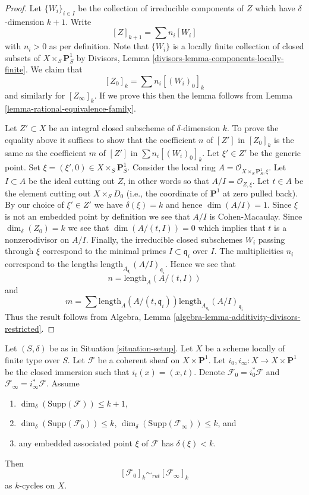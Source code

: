 \begin{proof}
Let $\{W_i\}_{i \in I}$ be the collection of irreducible
components of $Z$ which have $\delta$-dimension $k + 1$.
Write
$$
[Z]_{k + 1} = \sum n_i[W_i]
$$
with $n_i > 0$ as per definition. Note that $\{W_i\}$
is a locally finite collection of closed subsets of
$X \times_S \mathbf{P}^1_S$ by
Divisors, Lemma \ref{divisors-lemma-components-locally-finite}.
We claim that
$$
[Z_0]_k = \sum n_i[(W_i)_0]_k
$$
and similarly for $[Z_\infty]_k$. If we prove this then the lemma
follows from Lemma \ref{lemma-rational-equivalence-family}.

\medskip\noindent
Let $Z' \subset X$ be an integral closed subscheme of $\delta$-dimension $k$.
To prove the equality above it suffices to show that the coefficient $n$
of $[Z']$ in $[Z_0]_k$ is the same as the coefficient $m$ of
$[Z']$ in $\sum n_i[(W_i)_0]_k$. Let $\xi' \in Z'$ be the generic point.
Set $\xi = (\xi', 0) \in  X \times_S \mathbf{P}^1_S$.
Consider the local ring $A = \mathcal{O}_{X \times_S \mathbf{P}^1_S, \xi}$.
Let $I \subset A$ be the ideal cutting out $Z$, in other words so that
$A/I = \mathcal{O}_{Z, \xi}$. Let $t \in A$ be the element cutting
out $X \times_S D_0$ (i.e., the coordinate of $\mathbf{P}^1$ at zero
pulled back). By our choice of $\xi' \in Z'$ we have $\delta(\xi) = k$
and hence $\dim(A/I) = 1$. Since $\xi$ is not an embedded point by
definition we see that $A/I$ is Cohen-Macaulay. Since $\dim_\delta(Z_0)
= k$ we see that $\dim(A/(t, I)) = 0$ which implies that $t$
is a nonzerodivisor on $A/I$. Finally, the irreducible closed subschemes
$W_i$ passing through $\xi$ correspond to the minimal primes
$I \subset \mathfrak q_i$ over $I$. The multiplicities $n_i$ correspond
to the lengths $\text{length}_{A_{\mathfrak q_i}}(A/I)_{\mathfrak q_i}$.
Hence we see that
$$
n = \text{length}_A(A/(t, I))
$$
and
$$
m = \sum
\text{length}_A(A/(t, \mathfrak q_i))
\text{length}_{A_{\mathfrak q_i}}(A/I)_{\mathfrak q_i}
$$
Thus the result follows from
Algebra, Lemma \ref{algebra-lemma-additivity-divisors-restricted}.
\end{proof}

\begin{lemma}
\label{lemma-coherent-sheaf-cross-p1}
Let $(S, \delta)$ be as in Situation \ref{situation-setup}.
Let $X$ be a scheme locally of finite type over $S$.
Let $\mathcal{F}$ be a coherent sheaf on $X \times \mathbf{P}^1$.
Let $i_0, i_\infty : X \to X \times \mathbf{P}^1$ be the closed immersion
such that $i_t(x) = (x, t)$. Denote $\mathcal{F}_0 = i_0^*\mathcal{F}$ and
$\mathcal{F}_\infty = i_\infty^*\mathcal{F}$.
Assume
\begin{enumerate}
\item $\dim_\delta(\text{Supp}(\mathcal{F})) \leq k + 1$,
\item $\dim_\delta(\text{Supp}(\mathcal{F}_0)) \leq k$,
$\dim_\delta(\text{Supp}(\mathcal{F}_\infty)) \leq k$, and
\item any embedded associated point $\xi$ of $\mathcal{F}$ has
$\delta(\xi) < k$.
\end{enumerate}
Then
$$
[\mathcal{F}_0]_k \sim_{rat} [\mathcal{F}_\infty]_k
$$
as $k$-cycles on $X$.
\end{lemma}

